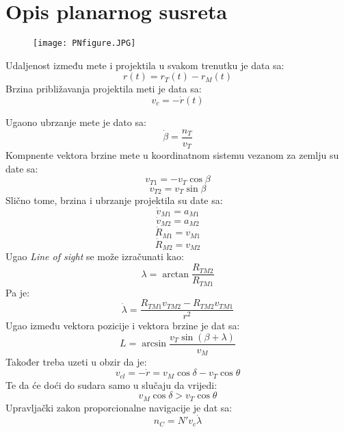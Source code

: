 
\section{Opis planarnog susreta}

\begin{figure}[h!]
    \centering
    \texttt{[image: PNfigure.JPG]}
\end{figure}

Udaljenost između mete i projektila u svakom trenutku je data sa:
\begin{equation}
    r(t)=r_T(t)-r_M(t)
\end{equation}
Brzina približavanja projektila meti je data sa: 
\begin{equation}
    v_c=-\dot{r}(t)
\end{equation}

Ugaono ubrzanje mete je dato sa:
\begin{equation}
    \dot{\beta}=\frac{n_T}{v_T}
\end{equation}
Kompnente vektora brzine mete u koordinatnom sistemu vezanom za zemlju su date sa:
\begin{equation}
    v_{T1}=-v_T\cos{\beta}
\end{equation}
\begin{equation}
    v_{T2}=v_T\sin{\beta}
\end{equation}
Slično tome, brzina i ubrzanje projektila su date sa:
\begin{equation}
    \dot{v}_{M1}=a_{M1}
\end{equation}
\begin{equation}
    \dot{v}_{M2}=a_{M2}
\end{equation}
\begin{equation}
    \dot{R}_{M1}=v_{M1}
\end{equation}
\begin{equation}
    \dot{R}_{M2}=v_{M2}
\end{equation}
Ugao \textit{Line of sight} se može izračunati kao:
\begin{equation}
    \lambda = \arctan{\frac{R_{TM2}}{R_{TM1}}}
\end{equation}
Pa je: 
\begin{equation}
    \dot{\lambda}=\frac{R_{TM1}v_{TM2}-R_{TM2}v_{TM1}}{r^2}
\end{equation}
Ugao između vektora pozicije i vektora brzine je dat sa:
\begin{equation}
    L=\arcsin{\frac{v_T\sin{(\beta+\lambda)}}{v_M}}
\end{equation}
Također treba uzeti u obzir da je:
\begin{equation}
    v_{cl}=-\dot{r}=v_M\cos\delta - v_T\cos\theta
\end{equation}
Te da će doći do sudara samo u slučaju da vrijedi: 
\begin{equation}
    v_M\cos\delta > v_T\cos\theta
\end{equation}
Upravljački zakon proporcionalne navigacije je dat sa:
\begin{equation}
    n_C=N'v_c\dot{\lambda}
\end{equation}

